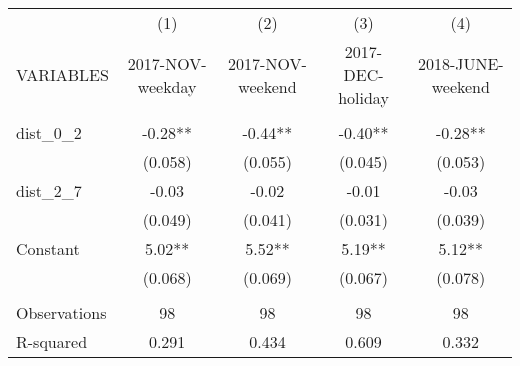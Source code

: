 \begin{tabular}{lcccc} \hline
 & (1) & (2) & (3) & (4) \\
VARIABLES & 2017-NOV-weekday & 2017-NOV-weekend & 2017-DEC-holiday & 2018-JUNE-weekend \\ \hline
 &  &  &  &  \\
dist\_0\_2 & -0.28** & -0.44** & -0.40** & -0.28** \\
 & (0.058) & (0.055) & (0.045) & (0.053) \\
dist\_2\_7 & -0.03 & -0.02 & -0.01 & -0.03 \\
 & (0.049) & (0.041) & (0.031) & (0.039) \\
Constant & 5.02** & 5.52** & 5.19** & 5.12** \\
 & (0.068) & (0.069) & (0.067) & (0.078) \\
 &  &  &  &  \\
Observations & 98 & 98 & 98 & 98 \\
 R-squared & 0.291 & 0.434 & 0.609 & 0.332 \\ \hline
\end{tabular}
